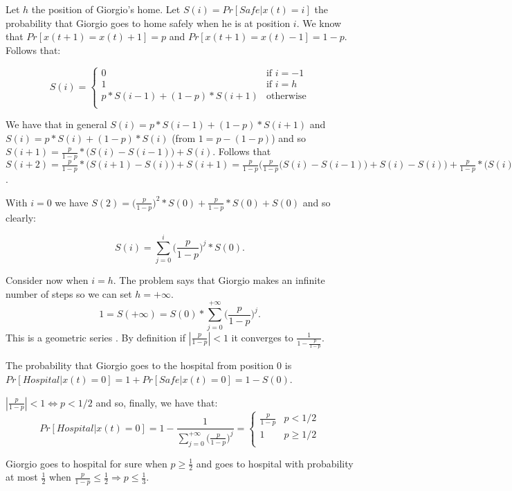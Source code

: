 \documentclass[paper=a4, fontsize=11pt]{scrartcl} %
\numberwithin{equation}{section} %
\numberwithin{figure}{section} %
\numberwithin{table}{section} %
\begin{document}
Let $h$ the position of Giorgio's home.
Let $S(i) = Pr[Safe|x(t)=i]$ the probability that Giorgio goes to home safely when he is at position $i$. We know that $Pr[x(t+1) = x(t)+1] = p$ and $Pr[x(t+1) = x(t)-1] = 1-p$. Follows that:

\[
S(i) = \begin{cases}
0 & \text{if }i = -1 \\
1 & \text{if }i = h \\
p*S(i-1) + (1-p)*S(i+1) & \text{otherwise} \\
\end{cases}
\]

We have that in general $S(i) = p*S(i-1) + (1-p)*S(i+1)$ and $S(i) = p*S(i) + (1-p)*S(i)$ (from $1 = p - (1-p)$) and so $S(i+1) = \frac{p}{1-p}*\big(S(i) - S(i-1)\big) + S(i)$.
Follows that $S(i+2) = \frac{p}{1-p}*\big(S(i+1) - S(i)\big) + S(i+1) = \frac{p}{1-p}\Big(\frac{p}{1-p}\big(S(i) - S(i-1)\big) + S(i) - S(i)\Big) + \frac{p}{1-p}*\big(S(i) - S(i-1)\big) + S(i)$.

With $i = 0$ we have $S(2) = \big(\frac{p}{1-p})^2*S(0) + \frac{p}{1-p}*S(0) + S(0)$ and so clearly:

\[
S(i) = \sum_{j=0}^{i} \Big(\frac{p}{1-p}\Big)^j*S(0).
\]

Consider now when $i = h$. The problem says that Giorgio makes an infinite number of steps so we can set $h = +\infty$.
\[
1 = S(+\infty) = S(0)*\sum_{j=0}^{+\infty} \Big(\frac{p}{1-p}\Big)^j.
\]
This is a geometric series \cite{geo}. By definition if $|\frac{p}{1-p}| < 1$ it converges to $\frac{1}{1-\frac{p}{1-p}}$.

The probability that Giorgio goes to the hospital from position 0 is $Pr[Hospital|x(t)=0] = 1 + Pr[Safe|x(t)=0] = 1 - S(0)$.

$|\frac{p}{1-p}| < 1 \Leftrightarrow p < 1/2$ and so, finally, we have that:
\[
Pr[Hospital|x(t)=0] = 1 - \frac{1}{\sum_{j=0}^{+\infty} \big(\frac{p}{1-p}\big)^j} = \begin{cases}
\frac{p}{1-p} & p < 1/2 \\
1 & p \geq 1/2 \\
\end{cases}
\]

Giorgio goes to hospital for sure when $p \geq \frac{1}{2}$ and goes to hospital with probability at most $\frac{1}{2}$ when $\frac{p}{1-p} \leq \frac{1}{2} \Rightarrow p \leq \frac{1}{3}$.


\vfill
 

\end{document}
